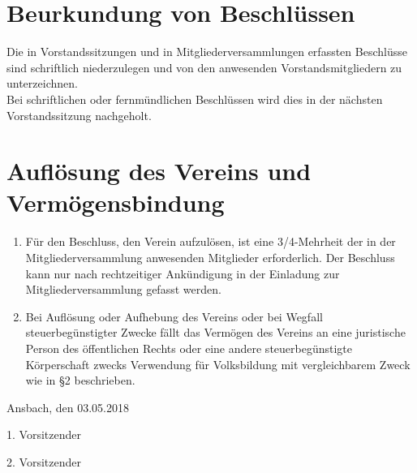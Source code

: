 \section{Beurkundung von Beschlüssen}
Die in Vorstandssitzungen und in Mitgliederversammlungen erfassten Beschlüsse sind schriftlich niederzulegen und von den anwesenden Vorstandsmitgliedern zu unterzeichnen.\\
Bei schriftlichen oder fernmündlichen Beschlüssen wird dies in der nächsten Vorstandssitzung nachgeholt.

\section{Auflösung des Vereins und Vermögensbindung}
\begin{enumerate}
  \item Für den Beschluss, den Verein aufzulösen, ist eine 3/4-Mehrheit der in der Mitgliederversammlung anwesenden Mitglieder erforderlich. Der Beschluss kann nur nach rechtzeitiger Ankündigung in der Einladung zur Mitgliederversammlung gefasst werden.
  \item Bei Auflösung oder Aufhebung des Vereins oder bei Wegfall steuerbegünstigter Zwecke fällt das Vermögen des Vereins an eine juristische Person des öffentlichen Rechts oder eine andere steuerbegünstigte Körperschaft zwecks Verwendung für Volksbildung mit vergleichbarem Zweck wie in §2 beschrieben.
\end{enumerate}

Ansbach, den 03.05.2018


1. Vorsitzender

2. Vorsitzender

